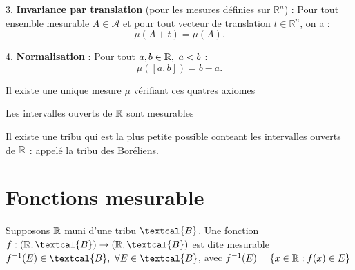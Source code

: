 3. \textbf{Invariance par translation} (pour les mesures définies sur $\mathbb{R}^n$) : Pour tout ensemble mesurable $A \in \mathcal{A}$ et pour tout vecteur de translation $t \in \mathbb{R}^n$, on a :
   \[
   \mu(A + t) = \mu(A).
   \]

4. \textbf{Normalisation} : Pour tout $a,b \in \mathbb{R}, ~ a<b$ : $$\mu([a,b]) = b-a.$$
\ed

\bigskip

\bp[Unicité]
Il existe une unique mesure $\mu$ vérifiant ces quatres axiomes
\ep

\bigskip

\bp[Ouverts de $\R$]
Les intervalles ouverts de $\R$ sont mesurables
\ep

\bigskip

Il existe une tribu qui est la plus petite possible conteant les intervalles ouverts de $\R$ : appelé la tribu des Boréliens.
\ep

\newpage

\section{Fonctions mesurable}

Supposons $\R$ muni d'une tribu $\textcal{B}$. Une fonction $f : (\R, \textcal{B}) \to (\R, \textcal{B})$ est dite mesurable \ssi $f^{-1}(E) \in \textcal{B}, ~ \forall E \in \textcal{B}$, avec $f^{-1}(E) = \{ x\in \mathbb{R} : f(x) \in E \}$
\ed



